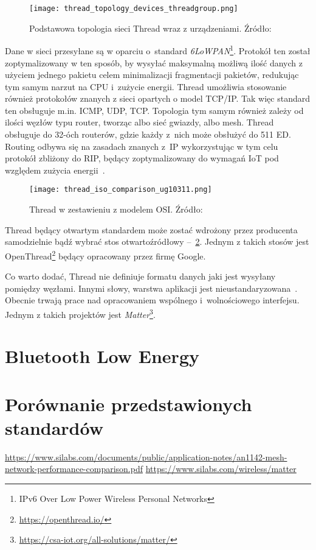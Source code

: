 \begin{figure}[!ht]
	\centering \texttt{[image: thread\_topology\_devices\_threadgroup.png]}
	\caption{Podstawowa topologia sieci Thread wraz z urządzeniami. Źródło:~\cite{thread_group_thread_2020}}
	\label{rys:thread_topology_devices_threadgroup}
\end{figure}

Dane w sieci przesyłane są w oparciu o~standard \textit{6LoWPAN}\footnote{IPv6 Over Low Power Wireless Personal Networks}.
Protokół ten został zoptymalizowany w ten sposób, by wysyłać maksymalną możliwą ilość danych z użyciem jednego
pakietu celem minimalizacji fragmentacji pakietów, redukując tym samym narzut na CPU i~zużycie energii.
Thread umożliwia stosowanie również protokołów znanych z sieci opartych o model TCP/IP. Tak więc
standard ten obsługuje m.in. \gls{ICMP}, \gls{UDP}, \gls{TCP}. Topologia tym samym również zależy od ilości
węzłów typu router, tworząc albo sieć gwiazdy, albo mesh. Thread obsługuje do 32-óch routerów, gdzie każdy
z~nich może obsłużyć do 511 \gls{ED}. Routing odbywa się na zasadach znanych z~\gls{IP}
wykorzystując w tym celu protokół zbliżony do \gls{RIP}, będący zoptymalizowany do wymagań
IoT pod względem zużycia energii~\cite{silicon_laboratories_ug10311_2022}.

\begin{figure}[!ht]
	\centering \texttt{[image: thread\_iso\_comparison\_ug10311.png]}
	\caption{Thread w zestawieniu z modelem OSI. Źródło:~\cite{silicon_laboratories_ug10311_2022}}
	\label{rys:thread_iso_comparison_ug10311}
\end{figure}

Thread będący otwartym standardem może zostać wdrożony przez producenta samodzielnie bądź wybrać stos otwartoźródłowy --~\ref{rys:thread_iso_comparison_ug10311}.
Jednym z takich stosów jest OpenThread\footnote{\url{https://openthread.io/}} będący opracowany przez firmę Google.

Co warto dodać, Thread nie definiuje formatu danych jaki jest wysyłany pomiędzy węzłami. Innymi słowy,
warstwa aplikacji jest nieustandaryzowana~\cite{silicon_laboratories_ug10311_2022}. Obecnie trwają
prace nad opracowaniem wspólnego i~wolnościowego interfejsu. Jednym z takich projektów jest \textit{Matter}\footnote{\url{https://csa-iot.org/all-solutions/matter/}}.

\section{Bluetooth Low Energy}
\lipsum[1-8]

\section{Porównanie przedstawionych standardów} %
\url{https://www.silabs.com/documents/public/application-notes/an1142-mesh-network-performance-comparison.pdf}
\url{https://www.silabs.com/wireless/matter}
\lipsum[1-15]


